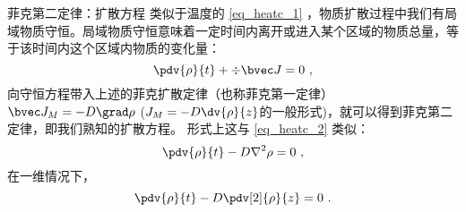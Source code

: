 \begin{example}{菲克第二定律：扩散方程}
类似于温度的 \autoref{eq_heatc_1} ，物质扩散过程中我们有局域物质守恒。局域物质守恒意味着一定时间内离开或进入某个区域的物质总量，等于该时间内这个区域内物质的变化量：
\begin{equation}
\pdv{\rho}{t} + \div \bvec J = 0~,
\end{equation}
向守恒方程带入上述的菲克扩散定律（也称菲克第一定律） $\bvec J_M=-D \grad \rho$ ($J_M=-D \dv{\rho}{z}$的一般形式)，就可以得到菲克第二定律，即我们熟知的扩散方程。 形式上这与 \autoref{eq_heatc_2} 类似：
\begin{equation}
\pdv{\rho}{t} - D \nabla^2 \rho = 0~,
\end{equation}
在一维情况下，
\begin{equation}
\pdv{\rho}{t} - D \pdv[2]{\rho}{z} = 0~.
\end{equation}
\end{example}

